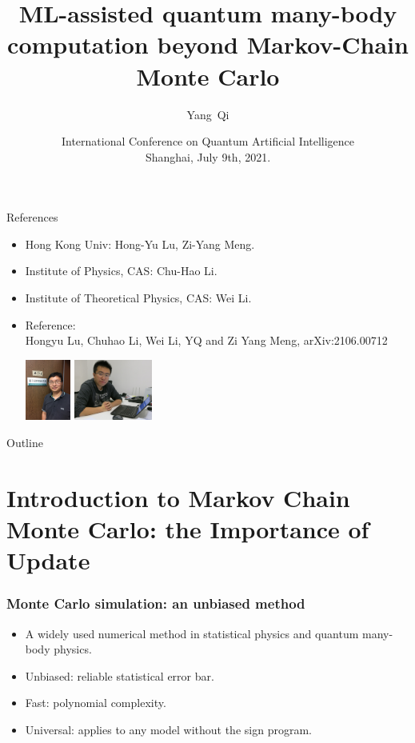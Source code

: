 \documentclass[xcolor=table, 10pt, aspectratio=169, ignorenonframetext]{beamer}
\title[CNNMC] %
{ML-assisted quantum many-body computation beyond Markov-Chain Monte Carlo}
\author[Y Qi] %
{Yang~Qi}
\institute[Fudan] %
{Department of Physics, Fudan University}
\date{International Conference on Quantum Artificial Intelligence\\Shanghai, July 9th, 2021.}
\begin{document}
\begin{frame}
  \titlepage
\end{frame}

\begin{frame}{References}
\begin{itemize}
\item Hong Kong Univ: Hong-Yu Lu, Zi-Yang Meng.
\item Institute of Physics, CAS: Chu-Hao Li.
\item Institute of Theoretical Physics, CAS: Wei Li.
\item Reference:\\
Hongyu Lu, Chuhao Li, Wei Li, YQ and Zi Yang Meng, arXiv:2106.00712
\begin{center}
	\includegraphics[height=2cm]{../people/weili}
	\includegraphics[height=2cm]{../people/ziyangmeng}
\end{center}
\end{itemize}
\end{frame}

\begin{frame}{Outline}
		\tableofcontents
\end{frame}

\section{Introduction to Markov Chain Monte Carlo: the Importance of Update}

\begin{frame}
  \frametitle{Monte Carlo simulation: an unbiased method}
  \begin{itemize}
    \item A widely used numerical method in statistical physics and quantum many-body physics.
    \item Unbiased: reliable statistical error bar.
    \item Fast: polynomial complexity.
    \item Universal: applies to any model without the sign program.
  \end{itemize}
\end{frame}
\end{document}
